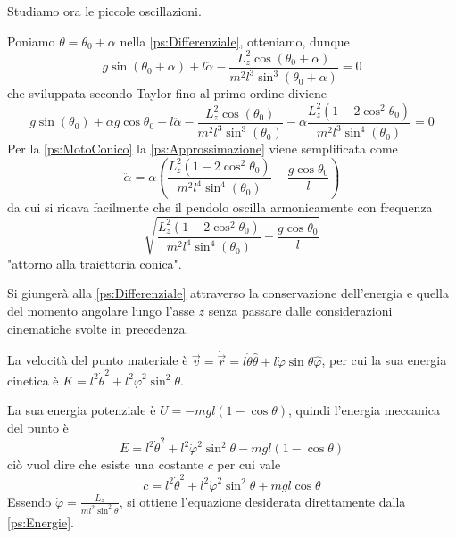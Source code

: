 \documentclass[../main.tex]{subfiles}
\begin{document}
Studiamo ora le piccole oscillazioni.

Poniamo $\theta=\theta_0+\alpha$ nella \cref{ps:Differenziale}, otteniamo, dunque
$$ g\sin(\theta_0+\alpha)+l\ddot{\alpha}-\frac{L_z^2\cos(\theta_0+\alpha)}{m^2l^3\sin^3(\theta_0+\alpha)}=0 $$
che sviluppata secondo Taylor fino al primo ordine diviene
\begin{equation}\label{ps:Approssimazione}
g\sin(\theta_0)+\alpha g\cos\theta_0+l\ddot{\alpha}-\frac{L_z^2\cos(\theta_0)}{m^2l^3\sin^3(\theta_0)}-\alpha\frac{L_z^2(1-2\cos^2\theta_0)}{m^2l^3\sin^4(\theta_0)}=0
\end{equation}
Per la \cref{ps:MotoConico} la \cref{ps:Approssimazione} viene semplificata come
\begin{equation}
\ddot{\alpha}=\alpha\left({\frac{L_z^2(1-2\cos^2\theta_0)}{m^2l^4\sin^4(\theta_0)}-\frac{g\cos\theta_0}{l}}\right)
\end{equation}
da cui si ricava facilmente che il pendolo oscilla armonicamente con frequenza $$\sqrt{\frac{L_z^2(1-2\cos^2\theta_0)}{m^2l^4\sin^4(\theta_0)}-\frac{g\cos\theta_0}{l}}$$ "attorno alla traiettoria conica".

\solution[2]
Si giunger\`a alla \cref{ps:Differenziale} attraverso la conservazione dell'energia e quella del momento angolare lungo l'asse $z$ senza passare dalle considerazioni cinematiche svolte in precedenza.

La velocit\`a del punto materiale \`e $\vec{v}=\dot{\vec{r}}=l\dot{\theta}\hat{\theta}+l\dot{\varphi}\sin\theta\hat{\varphi}$, per cui la sua energia cinetica \`e $K=l^2\dot{\theta}^2+l^2\dot{\varphi}^2\sin^2\theta$.

La sua energia potenziale \`e $U=-mgl(1-\cos\theta)$, quindi l'energia meccanica del punto \`e
\begin{equation*}
 E=l^2\dot{\theta}^2+l^2\dot{\varphi}^2\sin^2\theta-mgl(1-\cos\theta)
\end{equation*}
ci\`o vuol dire che esiste una costante $c$ per cui vale
\begin{equation}\label{ps:Energie}
c=l^2\dot{\theta}^2+l^2\dot{\varphi}^2\sin^2\theta+mgl\cos\theta
\end{equation}
Essendo $\displaystyle \dot{\varphi}=\frac{L_z}{ml^2\sin^2\theta}$, si ottiene l'equazione desiderata direttamente dalla \cref{ps:Energie}. 
\end{document}
